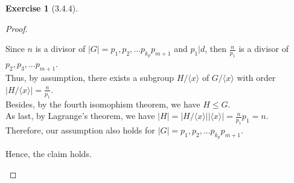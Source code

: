 \documentclass{amsart}
\theoremstyle{plain}
\theoremstyle{definition}
\newtheorem{exer}[lem]{Exercise}
\begin{document}
\begin{exer}[3.4.4]
\begin{proof}
\begin{enumerate}[(1)]
\begin{enumerate}[(a)]
				Since $n$ is a divisor of $|G|= p_1,p_2,...p_{k_p      }p_{m + 1}$ and $p_1|d$, then $\frac{n}{p_1}$ is a divisor of $p_2,p_3,...p_{m+1}$.\\
			   Thus, by assumption, there exists a subgroup $H/\langle x \rangle$ of $G/\langle x \rangle$ with order $|H/\langle x \rangle| = \frac{n}{p_1}$.\\
			   Besides, by the fourth isomophism theorem, we have $H \leq G$.\\ 
			   As last, by Lagrange's theorem, we have $|H| = |H/\langle x \rangle||\langle x \rangle|= \frac{n}{p_1} p_1 = n$.\\
			   Therefore, our assumption also holds for $|G|= p_1,p_2,...p_{k_p}p_{m + 1}$.
		\end{enumerate}
		Hence, the claim holds.\\
  \end{enumerate}
\end{proof}

\end{exer}
\end{document}
